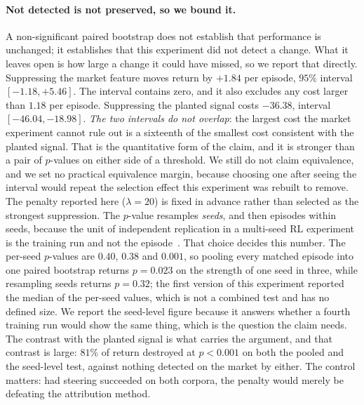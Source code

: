 \documentclass[10pt,twocolumn]{article}
\begin{document}
\paragraph{Not detected is not preserved, so we bound it.} A non-significant
paired bootstrap does not establish that performance is unchanged; it
establishes that this experiment did not detect a change. What it leaves open is
how large a change it could have missed, so we report that directly. Suppressing
the market feature moves return by $+1.84$ per episode, $95\%$ interval
$[-1.18, +5.46]$. The interval contains zero, and it also excludes any cost
larger than $1.18$ per episode. Suppressing the planted signal costs $-36.38$,
interval $[-46.04, -18.98]$. \emph{The two intervals do not overlap}: the
largest cost the market experiment cannot rule out is a sixteenth of the
smallest cost consistent with the planted signal. That is the quantitative form
of the claim, and it is stronger than a pair of $p$-values on either side of a
threshold. We still do not claim equivalence, and we set no practical
equivalence margin, because choosing one after seeing the interval would repeat
the selection effect this experiment was rebuilt to remove. The penalty reported
here
($\lambda=20$) is fixed in advance rather than selected as the strongest
suppression. The $p$-value resamples \emph{seeds}, and then episodes within
seeds, because the unit of independent replication in a multi-seed RL
experiment is the training run and not the
episode~\citep{agarwal2021precipice}. That choice decides this number. The
per-seed $p$-values are $0.40$, $0.38$ and $0.001$, so pooling every matched
episode into one paired bootstrap returns $p=0.023$ on the strength of one seed
in three, while resampling seeds returns $p=0.32$; the first version of this
experiment reported the median of the per-seed values, which is not a combined
test and has no defined size. We report the seed-level figure because it answers
whether a fourth training run would show the same thing, which is the question
the claim needs. The contrast with the planted signal is what carries the
argument, and that contrast is large: $81\%$ of return destroyed at $p<0.001$ on
both the pooled and the seed-level test, against nothing detected on the market
by either. The control matters: had steering succeeded on both corpora,
the penalty would merely be defeating the attribution method.
\end{document}

